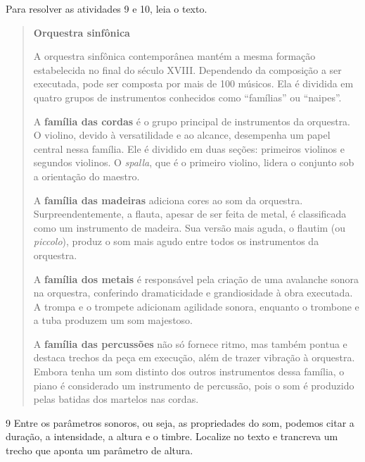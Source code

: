 Para resolver as atividades 9 e 10, leia o texto.

\begin{quote}
\textbf{Orquestra sinfônica}

A orquestra sinfônica contemporânea mantém a mesma formação 
estabelecida no final do século XVIII. Dependendo da composição 
a ser executada, pode ser composta por mais de 100 músicos. Ela 
é dividida em quatro grupos de instrumentos conhecidos como ``famílias'' 
ou ``naipes''.

A \textbf{família das cordas} é o grupo principal de instrumentos 
da orquestra. O violino, devido à versatilidade e ao alcance, desempenha 
um papel central nessa família. Ele é dividido em duas seções: primeiros 
violinos e segundos violinos. O \textit{spalla}, que é o primeiro violino, 
lidera o conjunto sob a orientação do maestro.

A \textbf{família das madeiras} adiciona cores ao som da orquestra. 
Surpreendentemente, a flauta, apesar de ser feita de metal, é classificada 
como um instrumento de madeira. Sua versão mais aguda, o flautim (ou 
\textit{piccolo}), produz o som mais agudo entre todos os instrumentos da 
orquestra.

A \textbf{família dos metais} é responsável pela criação de uma avalanche 
sonora na orquestra, conferindo dramaticidade e grandiosidade à obra executada. 
A trompa e o trompete adicionam agilidade sonora, enquanto o trombone e a tuba 
produzem um som majestoso.

A \textbf{família das percussões} não só fornece ritmo, mas também pontua e destaca 
trechos da peça em execução, além de trazer vibração à orquestra. Embora tenha um 
som distinto dos outros instrumentos dessa família, o piano é considerado um 
instrumento de percussão, pois o som é produzido pelas batidas dos martelos nas 
cordas.

\end{quote}

\num{9} Entre os parâmetros sonoros, ou seja, as propriedades do som, podemos
citar a duração, a intensidade, a altura e o timbre. Localize no texto e
trancreva um trecho que aponta um parâmetro de altura.


